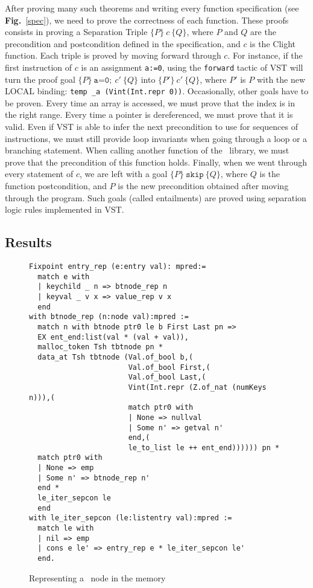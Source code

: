 After proving many such theorems and writing every function specification (see \textbf{Fig.}~\ref{spec}), we need to prove the correctness of each function.
These proofs consists in proving a Separation Triple $\{P\}~c~\{Q\}$, where $P$ and $Q$ are the precondition and postcondition defined in the specification, and $c$ is the Clight function.
Each triple is proved by moving forward through $c$.
For instance, if the first instruction of $c$ is an assignment \texttt{a:=0}, using the \texttt{forward} tactic of VST will turn the proof goal $\{P\}~\texttt{a=0};~c'~\{Q\}$ into $\{P'\}~c'~\{Q\}$,
where $P'$ is $P$ with the new LOCAL binding: \texttt{temp \_a (Vint(Int.repr 0))}.
Occasionally, other goals have to be proven.
Every time an array is accessed, we must prove that the index is in the right range.
Every time a pointer is dereferenced, we must prove that it is valid.
Even if VST is able to infer the next precondition to use for sequences of instructions, we must still provide loop invariants when going through a loop or a branching statement.
When calling another function of the \btrees\ library, we must prove that the precondition of this function holds.
Finally, when we went through every statement of $c$, we are left with a goal $\{P\}~\texttt{skip}~\{Q\}$, where $Q$ is the function postcondition, and $P$ is the new precondition obtained after moving through the program.
Such goals (called entailments) are proved using separation logic rules implemented in VST.

\subsection{Results}



\begin{figure}
\begin{lstlisting}[language=Coq]
Fixpoint entry_rep (e:entry val): mpred:=
  match e with
  | keychild _ n => btnode_rep n
  | keyval _ v x => value_rep v x
  end
with btnode_rep (n:node val):mpred :=
  match n with btnode ptr0 le b First Last pn =>
  EX ent_end:list(val * (val + val)),
  malloc_token Tsh tbtnode pn *
  data_at Tsh tbtnode (Val.of_bool b,(
                       Val.of_bool First,(
                       Val.of_bool Last,(
                       Vint(Int.repr (Z.of_nat (numKeys n))),(
                       match ptr0 with
                       | None => nullval
                       | Some n' => getval n'
                       end,(
                       le_to_list le ++ ent_end)))))) pn *
  match ptr0 with
  | None => emp
  | Some n' => btnode_rep n'
  end *
  le_iter_sepcon le
  end
with le_iter_sepcon (le:listentry val):mpred :=
  match le with
  | nil => emp
  | cons e le' => entry_rep e * le_iter_sepcon le'
  end.
\end{lstlisting}
\caption{Representing a \btree\ node in the memory}
\label{btnoderep}
\end{figure}
